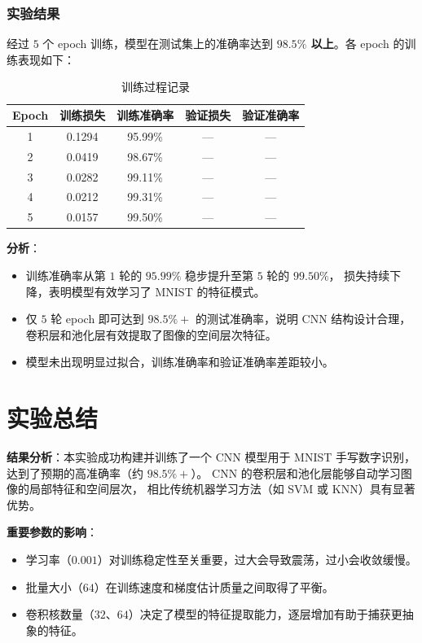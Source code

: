 \documentclass[UTF8]{ctexart}
\begin{document}
\subsubsection{实验结果}

经过 $5$ 个 epoch 训练，模型在测试集上的准确率达到 \textbf{$98.5\%$ 以上}。各 epoch 的训练表现如下：

\begin{table}[htbp]
\centering
\caption{训练过程记录}
\begin{tabular}{ccccc}
\toprule
Epoch & 训练损失 & 训练准确率 & 验证损失 & 验证准确率 \\
\midrule
1 & 0.1294 & 95.99\% & --- & --- \\
2 & 0.0419 & 98.67\% & --- & --- \\
3 & 0.0282 & 99.11\% & --- & --- \\
4 & 0.0212 & 99.31\% & --- & --- \\
5 & 0.0157 & 99.50\% & --- & --- \\
\bottomrule
\end{tabular}
\end{table}

\textbf{分析}：
\begin{itemize}
  \item 训练准确率从第 $1$ 轮的 $95.99\%$ 稳步提升至第 $5$ 轮的 $99.50\%$，
        损失持续下降，表明模型有效学习了 MNIST 的特征模式。
  \item 仅 $5$ 轮 epoch 即可达到 $98.5\%+$ 的测试准确率，说明 CNN 结构设计合理，
        卷积层和池化层有效提取了图像的空间层次特征。
  \item 模型未出现明显过拟合，训练准确率和验证准确率差距较小。
\end{itemize}

\section{实验总结}

\textbf{结果分析}：本实验成功构建并训练了一个 CNN 模型用于 MNIST 手写数字识别，
                  达到了预期的高准确率（约 $98.5\%+$）。
                  CNN 的卷积层和池化层能够自动学习图像的局部特征和空间层次，
                  相比传统机器学习方法（如 SVM 或 KNN）具有显著优势。

\textbf{重要参数的影响}：
\begin{itemize}
  \item 学习率（$0.001$）对训练稳定性至关重要，过大会导致震荡，过小会收敛缓慢。
  \item 批量大小（$64$）在训练速度和梯度估计质量之间取得了平衡。
  \item 卷积核数量（$32$、$64$）决定了模型的特征提取能力，逐层增加有助于捕获更抽象的特征。
\end{itemize}
\end{document}
